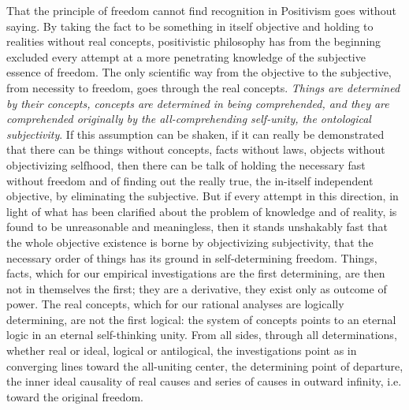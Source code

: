 \documentclass[12pt,a4paper,openany]{book}
\newcommand{\opage}[1]{\marginnote{\footnotesize\textit{[#1]}}}
\begin{document}
\setcounter{footnote}{0}%
\opage{207}That the principle of freedom cannot find recognition in Positivism goes without
saying. By taking the fact to be something in itself objective and holding to
realities without real concepts, positivistic philosophy has from the beginning
excluded every attempt at a more penetrating knowledge of the subjective essence of
freedom. The only scientific way from the objective to the subjective, from necessity
to freedom, goes through the real concepts. \emph{Things
are determined by their concepts, concepts
are determined in being comprehended, and they are comprehended
originally by the all-comprehending
self-unity, the ontological subjectivity}.
If this assumption can be shaken, if it can really be demonstrated that there can be
things without concepts, facts without laws, objects without objectivizing selfhood,
then there can be talk of holding the necessary fast without freedom and of finding out
the really true, the in-itself independent objective, by eliminating the subjective.
But if every attempt in this direction, in light of what has been clarified about the
problem of knowledge and of reality, is found to be unreasonable and meaningless, then
it stands unshakably fast that the whole objective existence is borne by objectivizing
subjectivity, that the necessary order of things has its ground in self-determining
freedom. Things, facts, which for our empirical investigations are the first
determining, are then not in themselves the first; they are a derivative, they exist
only
\setcounter{footnote}{0}%
\opage{208}as outcome of power. The real concepts, which for our rational analyses are
logically determining, are not the first logical: the system of concepts points to an
eternal logic in an eternal self-thinking unity. From all sides, through all
determinations, whether real or ideal, logical or antilogical, the investigations
point as in converging lines toward the all-uniting center, the determining point of
departure, the inner ideal causality of real causes and series of causes in outward
infinity, i.e. toward the original freedom.
\end{document}
